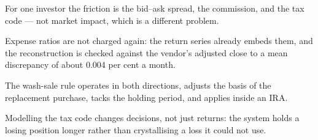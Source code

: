 \begin{keytakeaways}
\item For one investor the friction is the bid--ask spread, the commission,
and the tax code --- not market impact, which is a different problem.
\item Expense ratios are not charged again: the return series already
embeds them, and the reconstruction is checked against the vendor's
adjusted close to a mean discrepancy of about 0.004 per cent a month.
\item The wash-sale rule operates in both directions, adjusts the basis of
the replacement purchase, tacks the holding period, and applies inside an
IRA.
\item Modelling the tax code changes decisions, not just returns: the
system holds a losing position longer rather than crystallising a loss it
could not use.
\end{keytakeaways}
